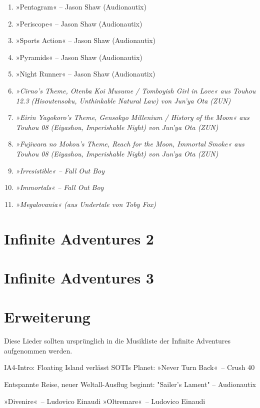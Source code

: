 \begin{enumerate}
    \item »Pentagram« – Jason Shaw (Audionautix)
    \item »Periscope« – Jason Shaw (Audionautix)
    \item »Sports Action« – Jason Shaw (Audionautix)
    \item »Pyramids« – Jason Shaw (Audionautix)
    \item »Night Runner« – Jason Shaw (Audionautix)
    \item \textit{»Cirno's Theme, Otenba Koi Musume / Tomboyish Girl in Love« aus Touhou 12.3 (Hisoutensoku, Unthinkable Natural Law) von Jun'ya Ota (ZUN)}
    \item \textit{»Eirin Yagokoro's Theme, Gensokyo Millenium / History of the Moon« aus Touhou 08 (Eiyashou, Imperishable Night) von Jun'ya Ota (ZUN)}
    \item \textit{»Fujiwara no Mokou's Theme, Reach for the Moon, Immortal Smoke« aus Touhou 08 (Eiyashou, Imperishable Night) von Jun'ya Ota (ZUN)}
    \item \textit{»Irresistible« – Fall Out Boy}
    \item \textit{»Immortals«  – Fall Out Boy}
    \item \textit{»Megalovania« (aus Undertale von Toby Fox)}

\end{enumerate}


\section{Infinite Adventures 2}


\section{Infinite Adventures 3}


\section{Erweiterung}

Diese Lieder sollten ursprünglich in die Musikliste der Infinite Adventures aufgenommen werden.

    IA4-Intro: Floating Island verlässt SOTIs Planet: »Never Turn Back«~– Crush 40

Entspannte Reise, neuer Weltall-Ausflug beginnt: "Sailer's Lament" – Audionautix

    »Divenire«~– Ludovico Einaudi
    »Oltremare«~– Ludovico Einaudi


